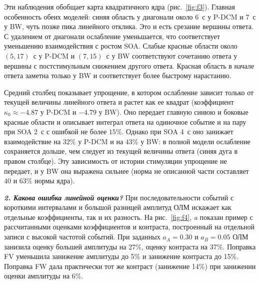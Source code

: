 Эти наблюдения обобщает карта квадратичного ядра (рис.~\ref{fig:f3}). Главная особенность обеих моделей: синяя область у диагонали около 6~с у P-DCM и 7~с у BW, чуть позже пика линейного отклика. Это и есть срезание вершины ответа. С удалением от диагонали ослабление уменьшается, что соответствует уменьшению взаимодействия с ростом SOA. Слабые красные области около $(5,17)$~с у P-DCM и $(7,15)$~с у BW соответствуют сочетанию ответа у вершины с постстимульным снижением другого ответа. Красная область в начале ответа заметна только у BW и соответствует более быстрому нарастанию.

Средний столбец показывает упрощение, в котором ослабление зависит только от текущей величины линейного ответа и растет как ее квадрат (коэффициент $\kappa_0\approx-4.87$ у P-DCM и $-4.79$ у BW). Оно передает главную синюю и боковые красные области и описывает интеграл ответа на одиночное событие и на пару при SOA 2~с с ошибкой не более $15\%$. Однако при SOA 4~с оно занижает взаимодействие на $32\%$ у P-DCM и на $43\%$ у BW: в полной модели ослабление сохраняется дольше, чем следует из текущей величины ответа (синяя дуга в правом столбце). Эту зависимость от истории стимуляции упрощение не передает, и у BW она выражена сильнее (норма не описанной части составляет $40$ и $63\%$ нормы ядра).

\FloatBarrier

\textbf{\textit{2. Какова ошибка линейной оценки?}} При последовательности событий с короткими интервалами и большой разницей амплитуд ОЛМ искажает как отдельные коэффициенты, так и их разность. На рис.~\ref{fig:f4}, \textit{a} показан пример с рассчитанными оценками коэффициентов и контраста, построенный на отдельной записи с высокой частотой событий. При заданных $a_A=0.30$ и $a_B=0.05$ ОЛМ занизила оценку большей амплитуды на 27\%, оценку контраста на 37\%. Поправка FV уменьшила занижение амплитуды до 5\% и занижение контраста до 15\%. Поправка FW дала практически тот же контраст (занижение 14\%) при занижении оценки амплитуды на 6\%.

